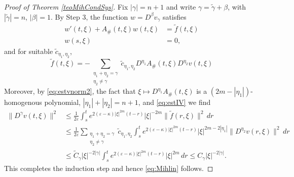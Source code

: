 \documentclass{amsart}
\theoremstyle{plain}
\theoremstyle{remark}
\theoremstyle{plain}
\numberwithin{equation}{section}
\begin{document}
\begin{proof}[Proof of Theorem \ref{teoMihCondSys}]
Fix $|\gamma|=n+1$ and write $\gamma=\tilde{\gamma}+\beta$, with $|\tilde{\gamma}|=n$, $|\beta|=1$. By Step 3, the function $w = D^{\beta} v_{\gamma}$ satisfies
\begin{equation}\label{eq:CauchyproblemFourierdiff2}
\begin{aligned}
  w'(t,\xi) + A_{\#}(t,\xi) w(t,\xi) & = \tilde{f}(t,\xi)
 \\  w(s,\xi) &= 0,
\end{aligned}
\end{equation}
and for suitable $\tilde{c}_{\eta_{1},\eta_{2}}$,
\[\tilde{f}(t,\xi) = - \sum_{\substack{\eta_{1}+\eta_{2}=\gamma \\ \eta_{2}\neq  \gamma}}\tilde{c}_{\eta_{1},\eta_{2}}D^{\eta_{1}} A_{\#}(t,\xi)D^{\eta_{2}}v(t,\xi)\]
Moreover, by \eqref{eq:estvnorm2}, the fact that $\xi\mapsto D^{\eta_1} A_{\#}(t,\xi)$ is a $(2m-|\eta_1|)$-homogenous polynomial, $|\eta_1| + |\eta_2| = n+1$, and \eqref{eq:estIV} we find
\begin{align*}
\|D^{\gamma}v(t,\xi)\|^2&\leq \frac{1}{2\varepsilon} \int_s^t e^{2(\varepsilon-\kappa) |\xi|^{2m} (t-r)} |\xi|^{-2m} \|\tilde{f}(r,\xi)\|^2 \, dr
\\ & \leq \frac{1}{2\varepsilon} \sum_{\substack{{\eta_{1}+\eta_{2}=\gamma} \\ {\eta_{2}\neq\gamma}}} \tilde{c}_{\eta_1, \eta_2} \int_s^t e^{2(\varepsilon-\kappa) |\xi|^{2m} (t-r)} |\xi|^{2m-2|\eta_1|}  \|D^{\eta_2} v(r,\xi)\|^2 \, dr
\\ & \leq \tilde{C}_{\gamma} |\xi|^{-2|\gamma|}\int_s^t e^{2(\varepsilon-\kappa) |\xi|^{2m} (t-r)} |\xi|^{2m}  \, dr \leq C_{\gamma} |\xi|^{-2|\gamma|}.
\end{align*}
This completes the induction step and hence \eqref{eq:Mihlin} follows.

\medskip


\end{proof}
\end{document}
